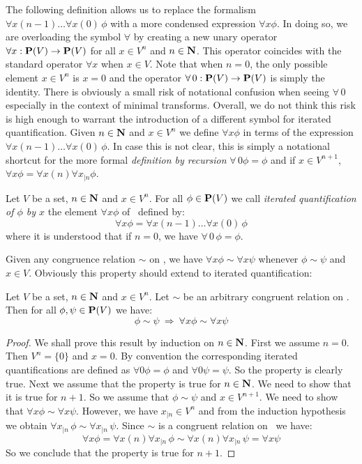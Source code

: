 The following definition allows us to replace the formalism $\forall
x(n-1)\ldots\forall x(0)\,\phi$ with a more condensed expression
$\forall x\phi$. In doing so, we are overloading the symbol
$\forall$ by creating a new unary operator $\forall x:\mbox{${\bf P}(V)$}\to\mbox{${\bf P}(V)$}$ for
all $x\in V^{n}$ and $n\in\mbox{$\bf N$}$. This operator coincides with the
standard operator $\forall x$ when $x\in V$. Note that when $n=0$,
the only possible element $x\in V^{n}$ is $x=0$ and the operator
$\forall\,0:\mbox{${\bf P}(V)$}\to \mbox{${\bf P}(V)$}$ is simply the identity. There is obviously a
small risk of notational confusion when seeing $\forall\, 0$
especially in the context of minimal transforms. Overall, we do not
think this risk is high enough to warrant the introduction of a
different symbol for iterated quantification. Given $n\in\mbox{$\bf N$}$ and
$x\in V^{n}$ we define $\forall x\phi$ in terms of the expression
$\forall x(n-1)\ldots\forall x(0)\,\phi$. In case this is not clear,
this is simply a notational shortcut for the more formal {\em
definition by recursion} $\forall\, 0\phi=\phi$ and if $x\in
V^{n+1}$, $\forall x\phi=\forall x(n)\forall x_{|n}\phi$.
\begin{defin}\label{logic:def:iterated:quant}
Let $V$ be a set, $n\in\mbox{$\bf N$}$ and $x\in V^{n}$. For all $\phi\in\mbox{${\bf P}(V)$}$ we
call {\em iterated quantification of $\phi$ by $x$} the element
$\forall x\phi$ of \pv\ defined by:
    \[
    \forall x\phi=\forall x(n-1)\ldots\forall x(0)\,\phi
    \]
where it is understood that if $n=0$, we have
$\forall\,0\,\phi=\phi$.
\end{defin}
Given any congruence relation $\sim$ on \pv, we have $\forall
x\phi\sim\forall x\psi$ whenever $\phi\sim\psi$ and $x\in V$.
Obviously this property should extend to iterated quantification:
\begin{prop}\label{logic:prop:iterated:congruence}
Let $V$ be a set, $n\in\mbox{$\bf N$}$ and $x\in V^{n}$. Let $\sim$ be an
arbitrary congruent relation on \pv. Then for all $\phi,\psi\in\mbox{${\bf P}(V)$}$
we have:
    \[
    \phi\sim\psi\ \Rightarrow\ \forall x\phi\sim\forall x\psi
    \]
\end{prop}
\begin{proof}
We shall prove this result by induction on $n\in\mbox{$\bf N$}$. First we assume
$n=0$. Then $V^{n}=\{0\}$ and $x=0$. By convention the corresponding
iterated quantifications are defined as $\forall 0\phi=\phi$ and
$\forall 0\psi=\psi$. So the property is clearly true. Next we
assume that the property is true for $n\in\mbox{$\bf N$}$. We need to show that
it is true for $n+1$. So we assume that $\phi\sim\psi$ and $x\in
V^{n+1}$. We need to show that $\forall x\phi\sim\forall x\psi$.
However, we have $x_{|n}\in V^{n}$ and from the induction hypothesis
we obtain $\forall x_{|n}\,\phi\sim\forall x_{|n}\,\psi$. Since
$\sim$ is a congruent relation on \pv\ we have:
    \[
    \forall x\phi=\forall x(n)\forall x_{|n}\,\phi\sim\forall
    x(n)\forall x_{|n}\,\psi=\forall x\psi
    \]
So we conclude that the property is true for $n+1$.
\end{proof}

